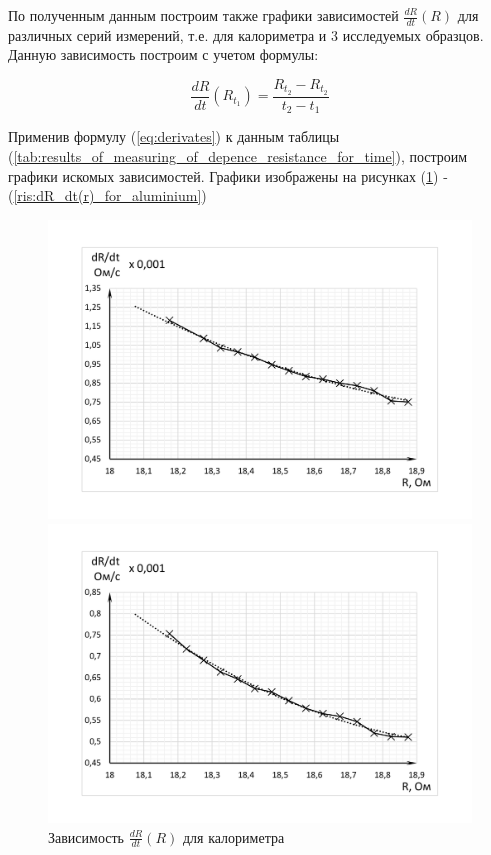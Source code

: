 \documentclass[12pt,a4paper]{article}
\begin{document}
	По полученным данным построим также графики зависимостей $\frac{dR}{dt} \left( R \right)$ для различных серий измерений, т.е. для калориметра и 3 исследуемых образцов. Данную зависимость построим с учетом формулы:
	
	\begin{equation}
		\frac{dR}{dt} \left( R_{t_{1}} \right) = \frac{R_{t_{2}} - R_{t_{2}}}{t_{2} - t_{1}}
		\label{eq:derivates}
	\end{equation}

	Применив формулу (\ref{eq:derivates})  к данным таблицы (\ref{tab:results_of_measuring_of_depence_resistance_for_time}), построим графики искомых зависимостей. Графики  изображены на рисунках (\ref{ris:dR_dt(r)_for_calorimetr}) - (\ref{ris:dR_dt(r)_for_aluminium})
	
	\begin{figure}[h!]
		\begin{center}
			\begin{minipage}[h]{0.48\linewidth}
				\includegraphics[width=1\linewidth]{dR_dt(r)_for_calorimetr}
				\caption{Зависимость $\frac{dR}{dt} \left( R \right)$ для калориметра} %
				\label{ris:dR_dt(r)_for_calorimetr} %
			\end{minipage}
		\hfill
			\begin{minipage}[h]{0.48\linewidth}
				\includegraphics[width=1\linewidth]{dR_dt(r)_for_steel}

\end{minipage}
\end{center}
\end{figure}
\end{document}
